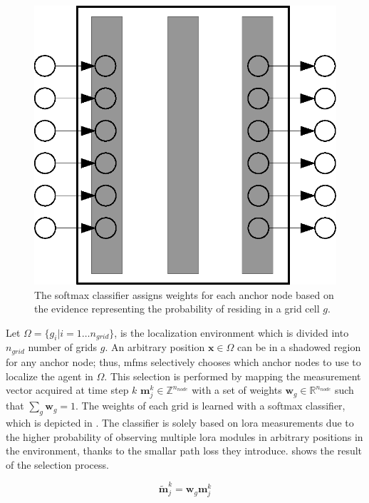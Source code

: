     \begin{figure}[thpb]
       \centering
       \includegraphics[width=\linewidth]{figures/softmax.eps}
       \caption{\label{fig:softmax}The softmax classifier assigns weights for each anchor node based on the evidence representing the probability of residing in a grid cell $g$.}
    \end{figure}

    Let $\Omega=\{g_i | i=1\ldots n_{grid}\}$, is the localization environment which is divided into $n_{grid}$ number of grids $g$.
    An arbitrary position $\bm{x} \in \Omega$ can be in a shadowed region for any anchor node; thus, \gls{mfms} selectively chooses which anchor nodes to use to localize the agent in $\Omega$.
    This selection is performed by mapping the measurement vector acquired at time step $k$ $\bm{m}^{k}_j \in \mathbb{Z}^{n_{node}}$ with a set of weights $\bm{w}_g \in \mathbb{R}^{n_{node}}$ such that $\sum_g \bm{w}_g = 1$.
    The weights of each grid is learned with a softmax classifier, which is depicted in .
    The classifier is solely based on \gls{lora} measurements due to the higher probability of observing multiple \gls{lora} modules in arbitrary positions in the environment, thanks to the smallar path loss they introduce.
     shows the result of the selection process.

    \begin{equation}
        \label{eq:weighted_m}
        \bm{\widetilde{m}}^{k}_j = \bm{w}_g \bm{m}^{k}_j
    \end{equation}

